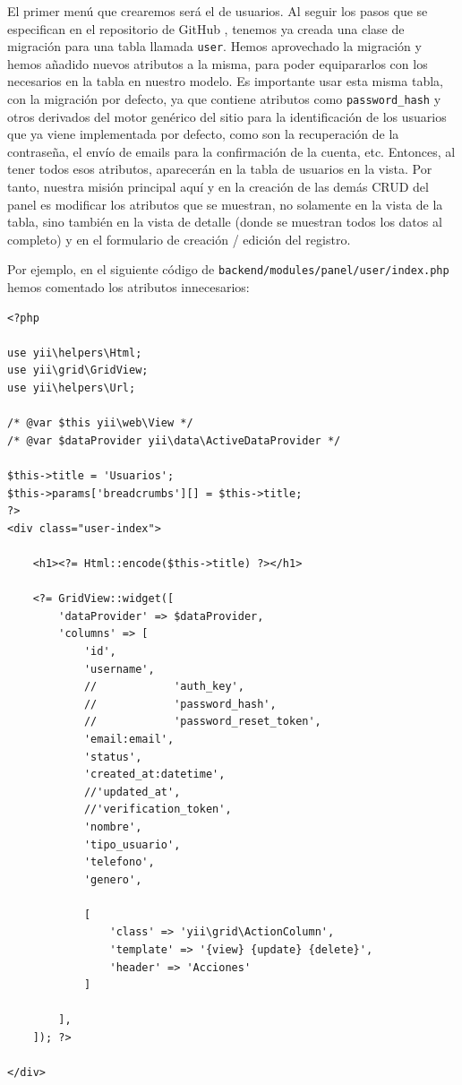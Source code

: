 El primer menú que crearemos será el de usuarios. Al seguir los pasos que se especifican en el repositorio de GitHub \cite{yii2advanced}, tenemos ya creada una clase de migración para una tabla llamada \texttt{user}. Hemos aprovechado la migración y hemos añadido nuevos atributos a la misma, para poder equipararlos con los necesarios en la tabla en nuestro modelo. Es importante usar esta misma tabla, con la migración por defecto, ya que contiene atributos como \texttt{password\_hash} y otros derivados del motor genérico del sitio para la identificación de los usuarios que ya viene implementada por defecto, como son la recuperación de la contraseña, el envío de emails para la confirmación de la cuenta, etc. Entonces, al tener todos esos atributos, aparecerán en la tabla de usuarios en la vista. Por tanto, nuestra misión principal aquí y en la creación de las demás CRUD del panel es modificar los atributos que se muestran, no solamente en la vista de la tabla, sino también en la vista de detalle (donde se muestran todos los datos al completo) y en el formulario de creación / edición del registro.

Por ejemplo, en el siguiente código de \texttt{backend/modules/panel/user/index.php} hemos comentado los atributos innecesarios:

\begin{verbatim}
<?php

use yii\helpers\Html;
use yii\grid\GridView;
use yii\helpers\Url;

/* @var $this yii\web\View */
/* @var $dataProvider yii\data\ActiveDataProvider */

$this->title = 'Usuarios';
$this->params['breadcrumbs'][] = $this->title;
?>
<div class="user-index">
	
	<h1><?= Html::encode($this->title) ?></h1>
	
	<?= GridView::widget([
		'dataProvider' => $dataProvider,
		'columns' => [
			'id',
			'username',
			//            'auth_key',
			//            'password_hash',
			//            'password_reset_token',
			'email:email',
			'status',
			'created_at:datetime',
			//'updated_at',
			//'verification_token',
			'nombre',
			'tipo_usuario',
			'telefono',
			'genero',
		
			[
				'class' => 'yii\grid\ActionColumn',
				'template' => '{view} {update} {delete}',
				'header' => 'Acciones'
			]
	
		],
	]); ?>

</div>

\end{verbatim}

